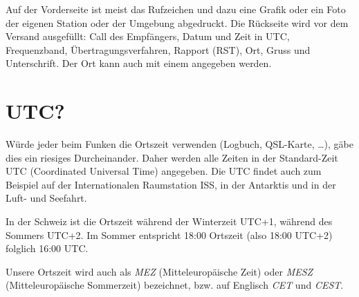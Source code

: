 Auf der Vorderseite ist meist das Rufzeichen und dazu eine Grafik oder ein Foto der eigenen Station oder der Umgebung abgedruckt. Die Rückseite wird vor dem Versand ausgefüllt: Call des Empfängers, Datum und Zeit in UTC, Frequenzband, Übertragungsverfahren, Rapport (RST), Ort, Gruss und Unterschrift. Der Ort kann auch mit einem  angegeben werden.

\section{UTC?}
Würde jeder beim Funken die Ortszeit verwenden (Logbuch, QSL-Karte, …), gäbe dies ein riesiges Durcheinander. Daher werden alle Zeiten in der Standard-Zeit UTC (Coordinated Universal Time) angegeben. Die UTC findet auch zum Beispiel auf der Internationalen Raumstation ISS, in der Antarktis und in der Luft- und Seefahrt.

In der Schweiz ist die Ortszeit während der Winterzeit UTC+1, während des Sommers UTC+2. Im Sommer entspricht 18:00 Ortszeit (also 18:00 UTC+2) folglich 16:00 UTC.

Unsere Ortszeit wird auch als \textit{MEZ} (Mitteleuropäische Zeit) oder \textit{MESZ} (Mitteleuropäische Sommer­zeit) bezeichnet, bzw. auf Englisch \textit{CET} und \textit{CEST}.